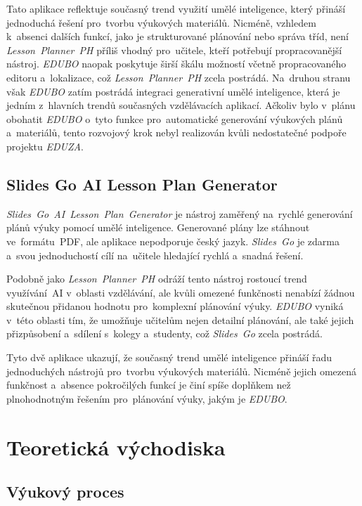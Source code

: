 \documentclass[male,czech,api_bc]{kitheses}
\begin{document}
Tato aplikace reflektuje současný trend využití umělé inteligence, který přináší jednoduchá řešení pro~tvorbu výukových materiálů. Nicméně, vzhledem k~absenci dalších funkcí, jako je strukturované plánování nebo správa tříd, není \textit{Lesson~Planner~PH} příliš vhodný pro~učitele, kteří potřebují propracovanější nástroj. \textit{EDUBO} naopak poskytuje širší škálu možností včetně propracovaného editoru a~lokalizace, což \textit{Lesson~Planner~PH} zcela postrádá. Na~druhou stranu však \textit{EDUBO} zatím postrádá integraci generativní umělé inteligence, která je jedním z~hlavních trendů současných vzdělávacích aplikací. Ačkoliv bylo v~plánu obohatit \textit{EDUBO} o~tyto funkce pro~automatické generování výukových plánů a~materiálů, tento rozvojový krok nebyl realizován kvůli nedostatečné podpoře projektu \textit{EDUZA}.

\section{Slides Go AI Lesson Plan Generator}

\textit{Slides~Go~AI~Lesson~Plan~Generator} je nástroj zaměřený na~rychlé generování plánů výuky pomocí umělé inteligence. Generované plány lze stáhnout ve~formátu~PDF, ale aplikace nepodporuje český jazyk. \textit{Slides~Go} je zdarma a~svou jednoduchostí cílí na~učitele hledající rychlá a~snadná řešení.

Podobně jako \textit{Lesson~Planner~PH} odráží tento nástroj rostoucí trend využívání~AI v~oblasti vzdělávání, ale kvůli omezené funkčnosti nenabízí žádnou skutečnou přidanou hodnotu pro~komplexní plánování výuky. \textit{EDUBO} vyniká v~této oblasti tím, že umožňuje učitelům nejen detailní plánování, ale také jejich přizpůsobení a~sdílení s~kolegy a~studenty, což \textit{Slides~Go} zcela postrádá.

Tyto dvě aplikace ukazují, že současný trend umělé inteligence přináší řadu jednoduchých nástrojů pro~tvorbu výukových materiálů. Nicméně jejich omezená funkčnost a~absence pokročilých funkcí je činí spíše doplňkem než plnohodnotným řešením pro~plánování výuky, jakým je \textit{EDUBO}.

\chapter{Teoretická východiska}
\section{Výukový proces}
\end{document}
